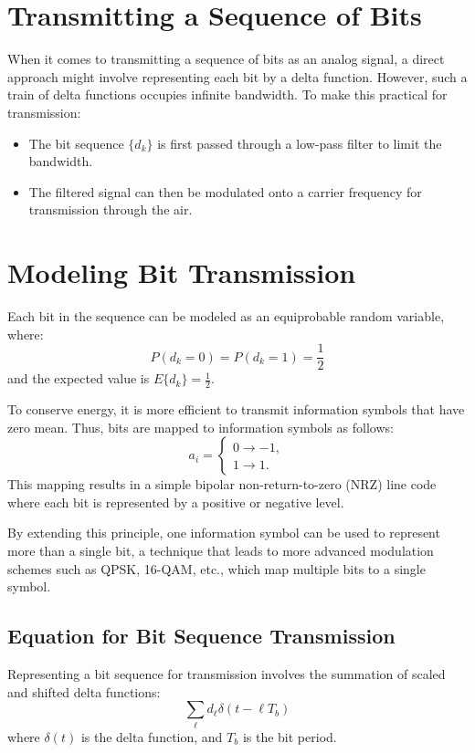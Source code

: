 \section*{Transmitting a Sequence of Bits}

When it comes to transmitting a sequence of bits as an analog signal, a direct approach might involve representing each bit by a delta function. However, such a train of delta functions occupies infinite bandwidth. To make this practical for transmission:

\begin{itemize}
    \item The bit sequence \( \{d_k\} \) is first passed through a low-pass filter to limit the bandwidth.
    \item The filtered signal can then be modulated onto a carrier frequency for transmission through the air.
\end{itemize}

\section*{Modeling Bit Transmission}

Each bit in the sequence can be modeled as an equiprobable random variable, where:
\[
P(d_k = 0) = P(d_k = 1) = \frac{1}{2}
\]
and the expected value is \( E\{d_k\} = \frac{1}{2} \).

To conserve energy, it is more efficient to transmit information symbols that have zero mean. Thus, bits are mapped to information symbols as follows:
\[
a_i =
\begin{cases}
  0 \rightarrow -1,\\
  1 \rightarrow 1.
\end{cases}
\]
This mapping results in a simple bipolar non-return-to-zero (NRZ) line code where each bit is represented by a positive or negative level.

By extending this principle, one information symbol can be used to represent more than a single bit, a technique that leads to more advanced modulation schemes such as QPSK, 16-QAM, etc., which map multiple bits to a single symbol.

\subsection*{Equation for Bit Sequence Transmission}
Representing a bit sequence for transmission involves the summation of scaled and shifted delta functions:
\[
\sum_{\ell} d_{\ell}\delta(t - \ell T_b)
\]
where \( \delta(t) \) is the delta function, and \( T_b \) is the bit period.


